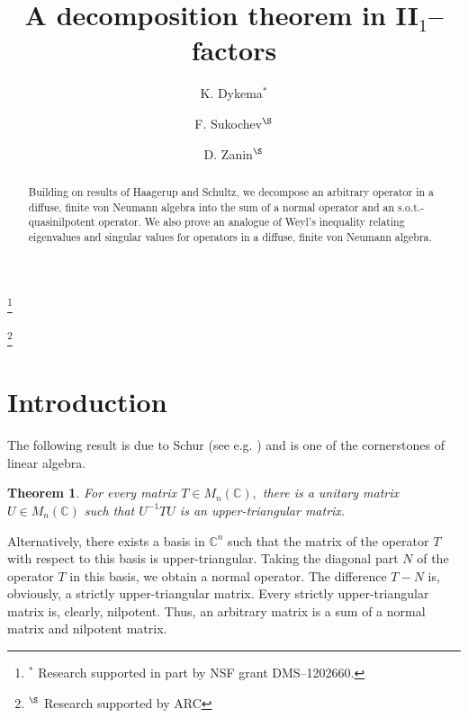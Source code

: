 \documentclass{amsart}
\theoremstyle{plain}
\newtheorem{thm}{Theorem}
\theoremstyle{remark}
\begin{document}
\title{A decomposition theorem in II$_1$--factors}

\author[Dykema]{K. Dykema$^*$}
\address{Department of Mathematics, Texas A\&M University, College Station, TX, USA.}
\thanks{\footnotesize ${}^{*}$ Research supported in part by NSF grant DMS--1202660.}
\author[Sukochev]{F. Sukochev$^{\S}$}
\address{School of Mathematics and Statistics, University of new South Wales, Kensington, NSW, Australia.}
\thanks{\footnotesize ${}^{\S}$ Research supported by ARC}
\author[Zanin]{D. Zanin$^{\S}$}
\address{School of Mathematics and Statistics, University of new South Wales, Kensington, NSW, Australia.}



\begin{abstract} 
Building on results of Haagerup and Schultz, we decompose an arbitrary operator in a diffuse, finite von Neumann algebra
into the sum of a normal operator and an s.o.t.-quasinilpotent operator. We also prove an analogue of Weyl's inequality relating eigenvalues and singular values for operators in a diffuse, finite von Neumann algebra.
\end{abstract}
\maketitle

\section{Introduction}

The following result is due to Schur (see e.g. \cite{Zhang}) and is one of the cornerstones of linear algebra.
\begin{thm} For every matrix $T\in M_n(\mathbb{C}),$ there is a unitary matrix $U\in M_n(\mathbb{C})$ such that $U^{-1}TU$ is an upper-triangular matrix.
\end{thm}

Alternatively, there exists a basis in $\mathbb{C}^n$ such that the matrix of the operator $T$ with respect to this basis is upper-triangular. Taking the diagonal part $N$ of the operator $T$ in this basis, we obtain a normal operator. The difference $T-N$ is, obviously, a strictly upper-triangular matrix. Every strictly upper-triangular matrix is, clearly, nilpotent. Thus, an arbitrary matrix is a sum of a normal matrix and nilpotent matrix.
\end{document}
